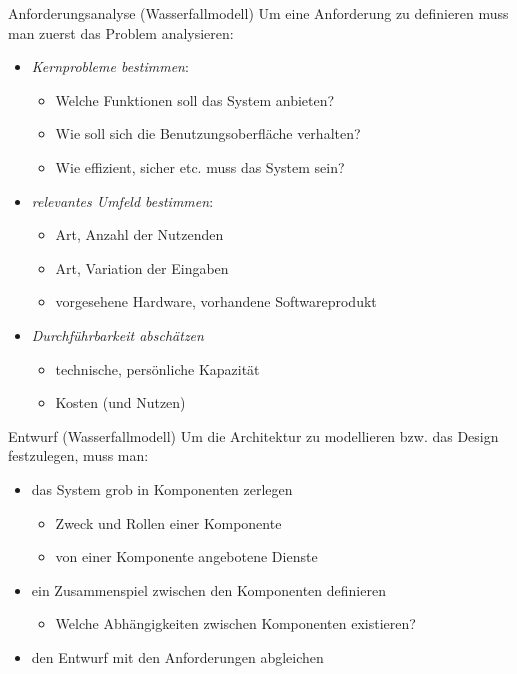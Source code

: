 \begin{bonus}{Anforderungsanalyse (Wasserfallmodell)}
    Um eine Anforderung zu definieren muss man zuerst das Problem analysieren:
    \begin{itemize}
        \item \emph{Kernprobleme bestimmen}:
              \begin{itemize}
                  \item Welche Funktionen soll das System anbieten?
                  \item Wie soll sich die Benutzungsoberfläche verhalten?
                  \item Wie effizient, sicher etc. muss das System sein?
              \end{itemize}
        \item \emph{relevantes Umfeld bestimmen}:
              \begin{itemize}
                  \item Art, Anzahl der Nutzenden
                  \item Art, Variation der Eingaben
                  \item vorgesehene Hardware, vorhandene Softwareprodukt
              \end{itemize}
        \item \emph{Durchführbarkeit abschätzen}
              \begin{itemize}
                  \item technische, persönliche Kapazität
                  \item Kosten (und Nutzen)
              \end{itemize}
    \end{itemize}
\end{bonus}

\begin{bonus}{Entwurf (Wasserfallmodell)}
    Um die Architektur zu modellieren bzw. das Design festzulegen, muss man:
    \begin{itemize}
        \item das System grob in Komponenten zerlegen
              \begin{itemize}
                  \item Zweck und Rollen einer Komponente
                  \item von einer Komponente angebotene Dienste
              \end{itemize}
        \item ein Zusammenspiel zwischen den Komponenten definieren
              \begin{itemize}
                  \item Welche Abhängigkeiten zwischen Komponenten existieren?
              \end{itemize}
        \item den Entwurf mit den Anforderungen abgleichen
    \end{itemize}
\end{bonus}

